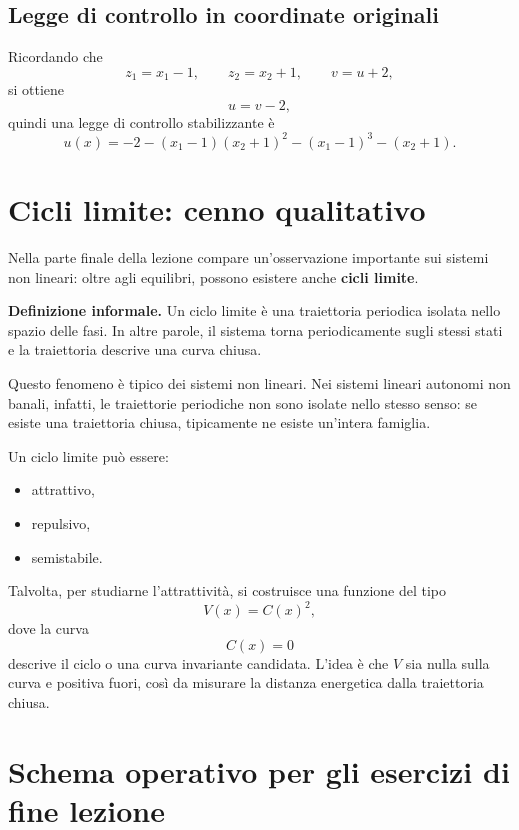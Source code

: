 \subsection{Legge di controllo in coordinate originali}

Ricordando che
\[
z_1=x_1-1,\qquad z_2=x_2+1,\qquad v=u+2,
\]
si ottiene
\[
u = v-2,
\]
quindi una legge di controllo stabilizzante è
\[
\boxed{
u(x)= -2 - (x_1-1)(x_2+1)^2 - (x_1-1)^3 - (x_2+1).
}
\]

\section{Cicli limite: cenno qualitativo}

Nella parte finale della lezione compare un'osservazione importante sui sistemi non lineari: oltre agli equilibri, possono esistere anche \textbf{cicli limite}.

\medskip

\noindent
\textbf{Definizione informale.}
Un ciclo limite è una traiettoria periodica isolata nello spazio delle fasi.  
In altre parole, il sistema torna periodicamente sugli stessi stati e la traiettoria descrive una curva chiusa.

\medskip

\noindent
Questo fenomeno è tipico dei sistemi non lineari.  
Nei sistemi lineari autonomi non banali, infatti, le traiettorie periodiche non sono isolate nello stesso senso: se esiste una traiettoria chiusa, tipicamente ne esiste un'intera famiglia.

\medskip

\noindent
Un ciclo limite può essere:
\begin{itemize}
    \item attrattivo,
    \item repulsivo,
    \item semistabile.
\end{itemize}

Talvolta, per studiarne l'attrattività, si costruisce una funzione del tipo
\[
V(x)=C(x)^2,
\]
dove la curva
\[
C(x)=0
\]
descrive il ciclo o una curva invariante candidata.  
L'idea è che \(V\) sia nulla sulla curva e positiva fuori, così da misurare la distanza energetica dalla traiettoria chiusa.

\section{Schema operativo per gli esercizi di fine lezione}

